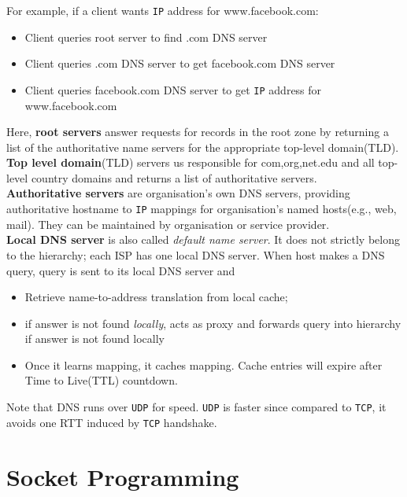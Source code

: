 \documentclass[12pt]{article}
\theoremstyle{definition}
\begin{document}
For example, if a client wants \texttt{IP} address for www.facebook.com:
\begin{itemize}
  \item Client queries root server to find .com DNS server

  \item Client queries .com DNS server to get facebook.com DNS server

  \item Client queries facebook.com DNS server to get \texttt{IP} address for www.facebook.com
\end{itemize}
Here, \textbf{root servers} answer requests for records in the root zone by returning a list of the authoritative name servers for the appropriate top-level domain(TLD).\\
\textbf{Top level domain}(TLD) servers us responsible for com,org,net.edu and all top-level country domains and returns a list of authoritative servers.\\
\textbf{Authoritative servers} are organisation's own DNS servers, providing authoritative hostname to \texttt{IP} mappings for organisation's named hosts(e.g., web, mail). They can be maintained by organisation or service provider.\\
\textbf{Local DNS server} is also called \textit{default name server}. It does not strictly belong to the hierarchy; each ISP has one local DNS server. When host makes a DNS query, query is sent to its local DNS server and
\begin{itemize}
  \item Retrieve name-to-address translation from local cache;
  \item if answer is not found \textit{locally}, acts as proxy and forwards query into hierarchy if answer is not found locally
  \item Once it learns mapping, it caches mapping. Cache entries will expire after Time to Live(TTL) countdown.
\end{itemize}
Note that DNS runs over \texttt{UDP} for speed. \texttt{UDP} is faster since compared to \texttt{TCP}, it avoids one RTT induced by \texttt{TCP} handshake.
\clearpage
\section{Socket Programming}
\end{document}
